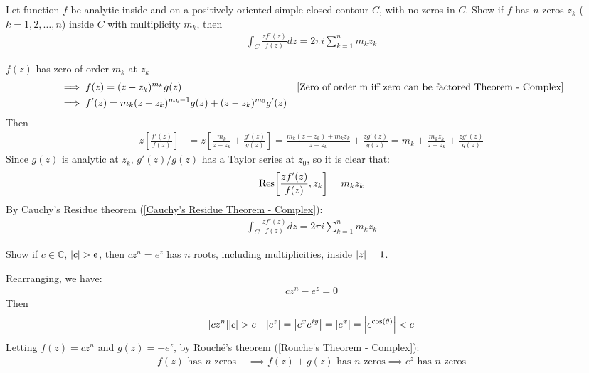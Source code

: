 \documentclass[12pt, english]{book}
\makeatletter
\renewenvironment{proof}[1][\proofname]{\par
	\pushQED{\qed}%
	\normalfont \topsep6\p@\@plus6\p@\relax
	\list{}{%
		\settowidth{\leftmargin}{\itshape\proofname:\hskip\labelsep}%
		\setlength{\labelwidth}{0pt}%
		\setlength{\itemindent}{-\leftmargin}%
	}%
	\item[\hskip\labelsep\itshape#1\@addpunct{:}]\ignorespaces
	}{ \popQED\endlist\@endpefalse}
\makeatother
\begin{document}
	\begin{example}
		Let function \(f\) be analytic inside and on a positively oriented simple closed contour \(C\), with no zeros in \(C\). Show if \(f\) has \(n\) zeros \(z_k\) (\(k = 1, 2, \ldots, n\)) inside \(C\) with multiplicity \(m_k\), then
		\begin{align*}
			\int_{C} \frac{zf'(z)}{f(z)} dz = 2 \pi i \sum_{k=1}^{n} m_k z_k
		\end{align*}
		\begin{proof}
			{\color{Grey}
			\(f(z)\) has zero of order \(m_k\) at \(z_k\)
			\begin{align*}
				&\implies f(z) = (z-z_k)^{m_k} g(z) 
					& \text{\Cref{Zero of order m iff zero can be factored Theorem - Complex}} \\
				&\implies f'(z) = m_k (z-z_k)^{m_k - 1} g(z) + (z-z_k)^{m_0} g'(z) \\
			\end{align*}
			Then 
			\begin{align*}
				z \left[\frac{f'(z)}{f(z)}\right]
				&= z \left[ \frac{m_k}{z-z_k} + \frac{g'(z)}{g(z)}\right]
				= \frac{m_k (z-z_k) + m_k z_k}{z-z_k} + \frac{z g'(z)}{g(z)} 
				= m_k + \frac{m_k z_k}{z-z_k} + \frac{z g'(z)}{g(z)}
			\end{align*}
			Since \(g(z)\) is analytic at \(z_k\), \(g'(z)/g(z)\) has a Taylor series at \(z_0\), so it is clear that:
			\begin{align*}
				\Res[\frac{zf'(z)}{f(z)}, z_k] = m_k z_k
			\end{align*}
			By Cauchy's Residue theorem (\cref{Cauchy's Residue Theorem - Complex}):
			\begin{align*}
				\int_{C} \frac{zf'(z)}{f(z)} dz = 2 \pi i \sum_{k=1}^{n} m_k z_k
			\end{align*}
			}
		\end{proof}
	\end{example}

	\begin{example}
		Show if \(c \in \mathbb{C}\), \(\abs{c}>e\), then \(cz^n = e^z\) has \(n\) roots, including multiplicities, inside \(\abs{z} = 1\).
		\begin{proof}
			{\color{Grey}
			Rearranging, we have:
			\begin{align*}
				cz^n - e^z = 0
			\end{align*}
			Then 
			\begin{align*}
				\abs{cz^n} & \abs{c} > e & \abs{e^z} = \abs{e^x e^{iy}} = \abs{e^x} = \abs{e^{\cos(\theta)}} < e
			\end{align*}
			Letting \(f(z) = cz^n\) and \(g(z) = -e^{z}\), by Rouché's theorem (\cref{Rouche's Theorem - Complex}):
		 	\begin{align*}
		 		f(z) \text{ has } n \text{ zeros } 
		 		&\implies f(z) + g(z) \text{ has } n \text{ zeros} 
		 		 \implies e^{z} \text{ has } n \text{ zeros}
		 	\end{align*}
			}
		\end{proof}
	\end{example}
\end{document}

